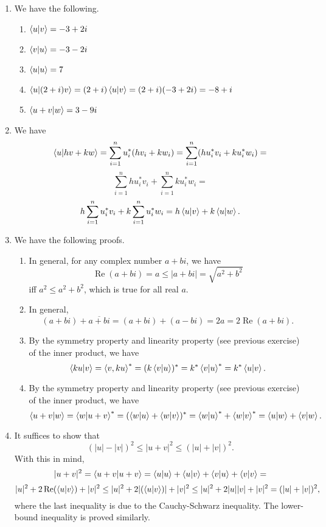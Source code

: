 \documentclass [12pt]{article}
\theoremstyle{definition}
\begin{document}
\begin{enumerate}
\item We have the following.

\begin{enumerate}
\item $\braket{u|v}=-3+2i$
\item $\braket{v|u}=-3-2i$
\item $\braket{u|u}=7$
\item $\braket{u|(2+i)v}=(2+i)\braket{u|v}=(2+i)(-3+2i)=-8+i$
\item $\braket{u+v|w}=3-9i$
\end{enumerate}


\item We have
\[\braket{u|hv+kw} = \sum_{i=1}^nu_i^*(hv_i + kw_i) =  \sum_{i=1}^n (hu_i^*v_i + ku_i^*w_i) = \]
\[\sum_{i=1}^n hu_i^*v_i  + \sum_{i=1}^n ku_i^*w_i=\]
\[h\sum_{i=1}^n u_i^*v_i  + k\sum_{i=1}^n u_i^*w_i=h\braket{u|v} + k\braket{u|w}.\]




\item We have the following proofs.

\begin{enumerate}
\item In general, for any complex number $a+bi$, we have 
\[\operatorname{Re}(a+bi) = a\leq |a+bi| =\sqrt{a^2+b^2}\] 
iff
$a^2\leq a^2+b^2$, which is true for all real $a$.

\item In general, 
\[(a+bi) + \overline{a+bi} = (a+bi) + (a-bi) = 2a = 2\operatorname{Re}(a+bi).\]


\item By the symmetry property and linearity property (see previous exercise) of the inner product, we have
\[\braket{ku|v} = \braket{v,ku}^* = (k\braket{v|u})^* = k^*\braket{v|u}^* = k^*\braket{u|v}.\]

\item By the symmetry property and linearity property (see previous exercise) of the inner product, we have
\[\braket{u+v|w} = \braket{w|u+v}^* = (\braket{w|u} + \braket{w|v})^* = \braket{w|u}^* + \braket{w|v}^* = \braket{u|w} + \braket{v|w}.\]

\end{enumerate}


\item It suffices to show that 
\[(|u|-|v|)^2 \leq |u+v|^2\leq (|u| + |v|)^2.\]
With this in mind,
\[|u+v|^2 = \braket{u+v|u+v} = \braket{u|u}+\braket{u|v} + \braket{v|u} + \braket{v|v} =\]
\[|u|^2 + 2\operatorname{Re}(\braket{u|v}) + |v|^2\leq |u|^2 + 2|(\braket{u|v})| + |v|^2 \leq |u|^2 + 2|u||v| + |v|^2 = (|u|+|v|)^2,\]
where the last inequality is due to the Cauchy-Schwarz inequality. The lower-bound inequality is proved similarly.






\end{enumerate}
\end{document}
